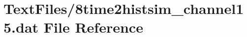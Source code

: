 \hypertarget{8time2histsim__channel15_8dat}{}\section{Text\+Files/8time2histsim\+\_\+channel15.dat File Reference}
\label{8time2histsim__channel15_8dat}
